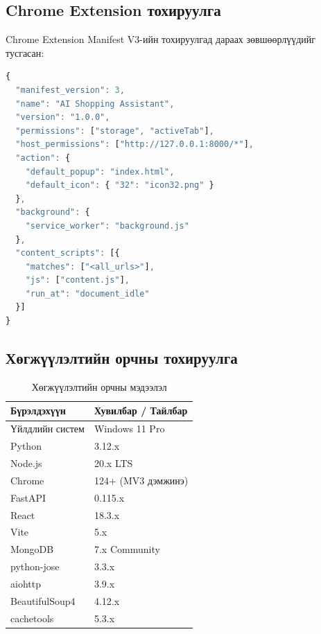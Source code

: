 \documentclass[12pt,a4paper]{report}
\begin{document}
\subsection{Chrome Extension тохируулга}

Chrome Extension Manifest V3-ийн тохируулгад дараах зөвшөөрлүүдийг тусгасан:

\begin{lstlisting}[language=JavaScript, caption={manifest.json тохируулга}, label={lst:manifest}]
{
  "manifest_version": 3,
  "name": "AI Shopping Assistant",
  "version": "1.0.0",
  "permissions": ["storage", "activeTab"],
  "host_permissions": ["http://127.0.0.1:8000/*"],
  "action": {
    "default_popup": "index.html",
    "default_icon": { "32": "icon32.png" }
  },
  "background": {
    "service_worker": "background.js"
  },
  "content_scripts": [{
    "matches": ["<all_urls>"],
    "js": ["content.js"],
    "run_at": "document_idle"
  }]
}
\end{lstlisting}

\subsection{Хөгжүүлэлтийн орчны тохируулга}

\begin{table}[H]
\centering
\caption{Хөгжүүлэлтийн орчны мэдээлэл}
\label{tab:dev_env}
\begin{tabularx}{\textwidth}{@{}lX@{}}
\toprule
\textbf{Бүрэлдэхүүн} & \textbf{Хувилбар / Тайлбар} \\
\midrule
Үйлдлийн систем & Windows 11 Pro \\
Python & 3.12.x \\
Node.js & 20.x LTS \\
Chrome & 124+ (MV3 дэмжинэ) \\
FastAPI & 0.115.x \\
React & 18.3.x \\
Vite & 5.x \\
MongoDB & 7.x Community \\
python-jose & 3.3.x \\
aiohttp & 3.9.x \\
BeautifulSoup4 & 4.12.x \\
cachetools & 5.3.x \\
\bottomrule
\end{tabularx}
\end{table}

\end{document}
